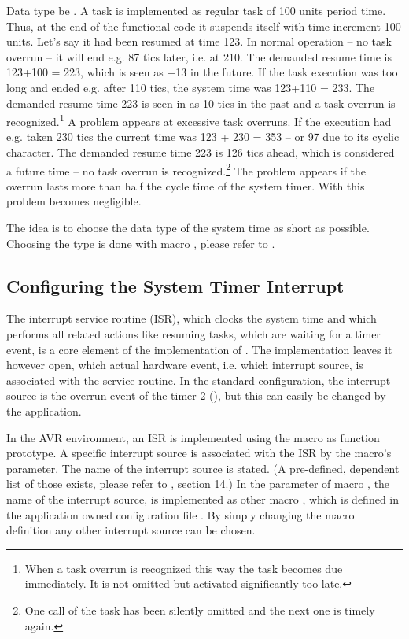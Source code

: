 Data type be  . A task is implemented as regular task of
100 units period time. Thus, at the end of the functional code it suspends
itself with time increment 100 units. Let's say it had been resumed at
time 123. In normal operation -- no task overrun -- it will end e.g. 87
tics later, i.e. at 210. The demanded resume time is 123+100 = 223, which
is seen as +13 in the future. If the task execution was too long and ended
e.g. after 110 tics, the system time was 123+110 = 233. The demanded
resume time 223 is seen in as 10 tics in the past and a task overrun is
recognized.\footnote{When a task overrun is recognized this way the task
becomes due immediately. It is not omitted but activated significantly too
late.} A problem appears at excessive task overruns. If the execution had
e.g. taken 230 tics the current time was 123 + 230 = 353 -- or 97 due to
its cyclic character. The demanded resume time 223 is 126 tics ahead,
which is considered a future time -- no task overrun is
recognized.\footnote{One call of the task has been silently omitted and
the next one is timely again.} The problem appears if the overrun lasts
more than half the cycle time of the system timer. With 
this problem becomes negligible.

The idea is to choose the data type of the system time as short as
possible. Choosing the type is done with macro
, please refer to
.


\subsection{Configuring the System Timer Interrupt}

The interrupt service routine (ISR), which clocks the system time and
which performs all related actions like resuming tasks, which are waiting
for a timer event, is a core element of the implementation of \rtos{}. The
implementation leaves it however open, which actual hardware event, i.e.
which interrupt source, is associated with the service routine. In the
standard configuration, the interrupt source is the overrun event of the
timer 2 (), but this can easily be changed by the
application.

In the AVR environment, an ISR is implemented using the macro 
as function prototype. A specific interrupt source is associated with the
ISR by the macro's parameter. The name of the interrupt source is stated.
(A pre-defined, \uC{} dependent list of those exists, please refer to
, section 14.) In \rtos{} the parameter of macro
, the name of the interrupt source, is implemented as other
macro ,
which is defined in the application owned configuration file
. By simply changing the macro definition any other
interrupt source can be chosen.


